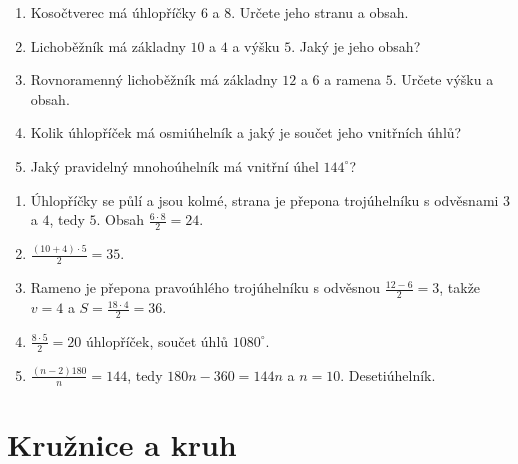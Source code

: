 \begin{problem}
  \begin{enumerate}[label=(\alph*)]
    \item Kosočtverec má úhlopříčky $6$ a $8$. Určete jeho stranu a obsah.
    \item Lichoběžník má základny $10$ a $4$ a výšku $5$. Jaký je jeho obsah?
    \item Rovnoramenný lichoběžník má základny $12$ a $6$ a ramena $5$. Určete výšku a obsah.
    \item Kolik úhlopříček má osmiúhelník a jaký je součet jeho vnitřních úhlů?
    \item Jaký pravidelný mnohoúhelník má vnitřní úhel $144^\circ$?
  \end{enumerate}
\end{problem}

\begin{solution}
  \begin{enumerate}[label=(\alph*)]
    \item Úhlopříčky se půlí a jsou kolmé, strana je přepona trojúhelníku s odvěsnami $3$ a $4$, tedy $5$. Obsah $\frac{6\cdot 8}{2} = 24$.
    \item $\frac{(10 + 4)\cdot 5}{2} = 35$.
    \item Rameno je přepona pravoúhlého trojúhelníku s odvěsnou $\frac{12 - 6}{2} = 3$, takže $v = 4$ a $S = \frac{18\cdot 4}{2} = 36$.
    \item $\frac{8\cdot 5}{2} = 20$ úhlopříček, součet úhlů $1080^\circ$.
    \item $\frac{(n - 2)180}{n} = 144$, tedy $180n - 360 = 144n$ a $n = 10$. Desetiúhelník.
  \end{enumerate}
\end{solution}

\section{Kružnice a kruh}\label{sec:kruznice-kruh}

